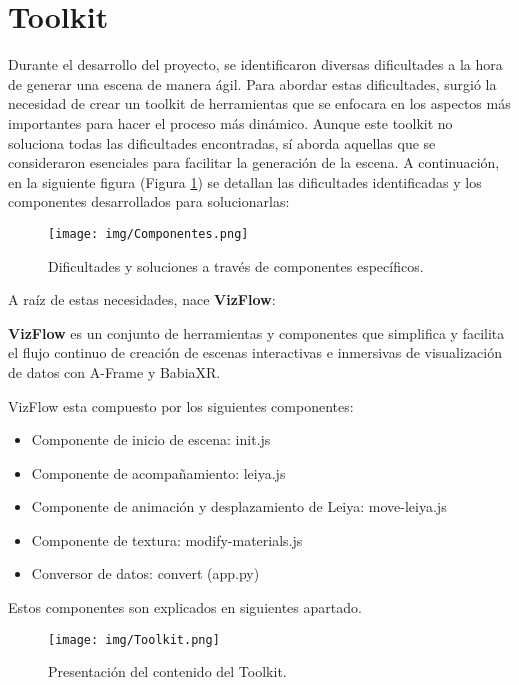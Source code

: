 \documentclass[a4paper, 12pt]{book}
\begin{document}
\newpage
\section {Toolkit}

Durante el desarrollo del proyecto, se identificaron diversas dificultades a la hora de generar una escena de manera ágil. Para abordar estas dificultades, surgió la necesidad de crear un toolkit de herramientas que se enfocara en los aspectos más importantes para hacer el proceso más dinámico. Aunque este toolkit no soluciona todas las dificultades encontradas, sí aborda aquellas que se consideraron esenciales para facilitar la generación de la escena. A continuación, en la siguiente figura (Figura \ref{fig:componentes}) se detallan las dificultades identificadas y los componentes desarrollados para solucionarlas:


\begin{figure}[H]
  \centering
  \texttt{[image: img/Componentes.png]}
  \caption{Dificultades y soluciones a través de componentes específicos.}
  \label{fig:componentes}
\end{figure}

A raíz de estas necesidades, nace \textbf{VizFlow}:

\textbf{VizFlow} es un conjunto de herramientas y componentes que simplifica y facilita el flujo continuo de creación de escenas interactivas e inmersivas de visualización de datos con A-Frame y BabiaXR.

VizFlow esta compuesto por los siguientes componentes:

\begin{itemize}
    \item Componente de inicio de escena: init.js   
    \item Componente de acompañamiento: leiya.js
    \item Componente de animación y desplazamiento de Leiya: move-leiya.js
    \item Componente de textura: modify-materials.js
    \item Conversor de datos: convert (app.py)   
\end{itemize}

Estos componentes son explicados en siguientes apartado.

\begin{figure}[H]
\centering
\texttt{[image: img/Toolkit.png]}
\caption{Presentación del contenido del Toolkit.}
\label{fig:Toolkit}
\end{figure}
\end{document}
